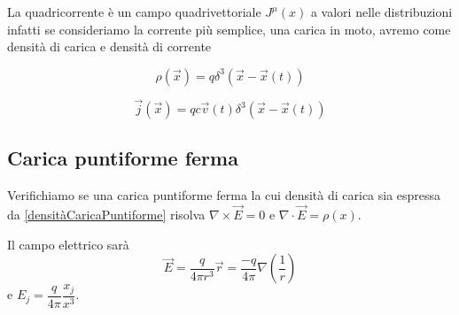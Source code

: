 \documentclass[12pt,a4paper,titlepage, twoside, openright]{book}
\numberwithin{equation}{chapter}
\begin{document}
La quadricorrente è un campo quadrivettoriale $J^\mu(x)$ a valori nelle distribuzioni infatti se consideriamo la corrente più semplice, una carica in moto, avremo come densità di carica e densità di corrente

\begin{table}[H]
\begin{minipage}{0.45\linewidth}
\begin{equation}
\rho(\vec{x})=q\delta^3\left(\vec{x}-\vec{x}(t)\right) \label{densitàCaricaPuntiforme}
\end{equation}
\end{minipage}
\begin{minipage}{0.45\linewidth}
\begin{equation}
\vec{j}(\vec{x})=qc\vec{v}(t)\delta^3\left(\vec{x}-\vec{x}(t)\right)
\end{equation}
\end{minipage}
\end{table}

\subsection{Carica puntiforme ferma}
Verifichiamo se una carica puntiforme ferma la cui densità di carica sia espressa da \ref{densitàCaricaPuntiforme} risolva $\nabla\times\vec{E}=0$ e $\nabla\cdot\vec{E}=\rho(x)$.

Il campo elettrico sarà 
\begin{equation}
\vec{E}=\dfrac{q}{4\pi r^3} \vec{r}=\dfrac{-q}{4\pi}\nabla\left(\dfrac{1}{r}\right)
\end{equation}
e $E_j=\dfrac{q}{4\pi}\dfrac{x_j}{x^3}$.
\end{document}

